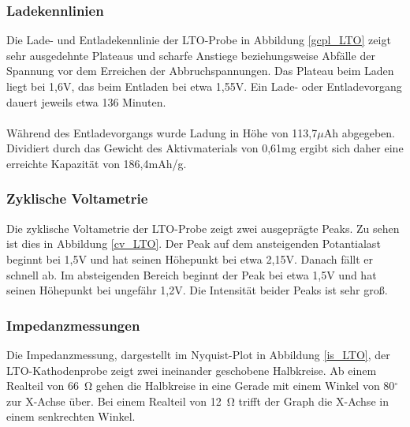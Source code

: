 \documentclass[a4paper, 11pt, headsepline,footsepline,twoside,abstract]{scrbook}
\begin{document}
\subsubsection{Ladekennlinien}
Die Lade- und Entladekennlinie der LTO-Probe in Abbildung \ref{gcpl_LTO} zeigt sehr ausgedehnte Plateaus und scharfe Anstiege beziehungsweise Abfälle der Spannung vor dem Erreichen der Abbruchspannungen. Das Plateau beim Laden liegt bei 1,6V, das beim Entladen bei etwa 1,55V. Ein Lade- oder Entladevorgang dauert jeweils etwa 136 Minuten.
\\\\
Während des Entladevorgangs wurde Ladung in Höhe von 113,7$\mu$Ah abgegeben. Dividiert durch das Gewicht des Aktivmaterials von 0,61mg ergibt sich daher eine erreichte Kapazität von 186,4mAh/g.
\subsubsection{Zyklische Voltametrie}
Die zyklische Voltametrie der LTO-Probe zeigt zwei ausgeprägte Peaks. Zu sehen ist dies in Abbildung \ref{cv_LTO}. Der Peak auf dem ansteigenden Potantialast beginnt bei 1,5V und hat seinen Höhepunkt bei etwa 2,15V. Danach fällt er schnell ab. Im absteigenden Bereich beginnt der Peak bei etwa 1,5V und hat seinen Höhepunkt bei ungefähr 1,2V. Die Intensität beider Peaks ist sehr groß.
\subsubsection{Impedanzmessungen}
Die Impedanzmessung, dargestellt im Nyquist-Plot in Abbildung \ref{is_LTO}, der LTO-Kathoden\-probe zeigt zwei ineinander geschobene Halbkreise. Ab einem Realteil von \SI{66}{\ohm} gehen die Halbkreise in eine Gerade mit einem Winkel von 80$^\circ$ zur X-Achse über. Bei einem Realteil von \SI{12}{\ohm} trifft der Graph die X-Achse in einem senkrechten Winkel.
\newpage
\end{document}
